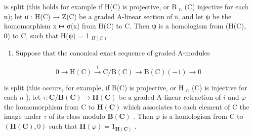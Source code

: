 is split (this holds for example if H(C) is projective, or B \(_{n}\) (C) injective for each n); let σ : H(C) → Z(C) be a graded A-linear section of π, and let ψ be the homomorphism x ↦ σ(x) from H(C) to C. Then ψ is a homologism from (H(C), 0) to C, such that H(ψ) = 1 \(_{H(C)}\) .

\begin{enumerate}
\def\labelenumi{\alph{enumi})}
\setcounter{enumi}{1}
\tightlist
\item
  Suppose that the canonical exact sequence of graded A-modules
\end{enumerate}

\[
0 \rightarrow \mathrm{H} (\mathrm{C}) \stackrel {i} {\rightarrow} \mathrm{C} / \mathrm{B} (\mathrm{C}) \rightarrow \mathrm{B} (\mathrm{C}) (- 1) \rightarrow 0\tag{IV}
\]

is split (this occurs, for example, if B(C) is projective, or H \(_{n}\) (C) is injective for each \(n\) ); let \(\tau: \mathbf{C} / \mathbf{B}(\mathbf{C}) \to \mathbf{H}(\mathbf{C})\) be a graded A-linear retraction of \(i\) and \(\varphi\) the homomorphism from C to \(\mathbf{H}(\mathbf{C})\) which associates to each element of C the image under \(\tau\) of its class modulo \(\mathbf{B}(\mathbf{C})\) . Then \(\varphi\) is a homologism from C to \((\mathbf{H}(\mathbf{C}), 0)\) such that \(\mathbf{H}(\varphi) = 1_{\mathbf{H}(\mathbf{C})}\) .

